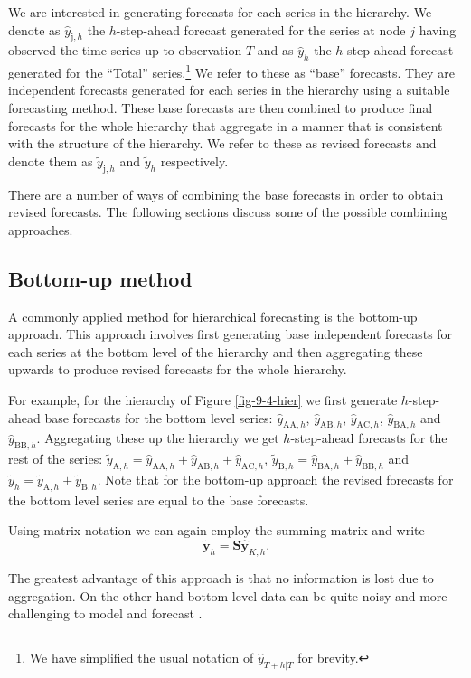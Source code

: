\documentclass[nojss]{jss}
\def\yhat#1#2{\hat{y}_{\text{#1},#2}}
\def\ytilde#1#2{\tilde{y}_{\text{#1},#2}}
\begin{document}
We are interested in generating forecasts for each series in the hierarchy. We denote as $\yhat{j}{h}$ the $h$-step-ahead forecast generated for the series at node $j$ having observed the time series up to observation $T$ and as $\hat{y}_{h}$ the $h$-step-ahead forecast generated for the ``Total'' series.\footnote{We have simplified the usual notation of $\hat{y}_{T+h|T}$ for brevity.} We refer to these as ``base'' forecasts. They are independent forecasts generated for each series in the hierarchy using a suitable forecasting method. These base forecasts are then combined to produce final forecasts for the whole hierarchy that aggregate in a manner that is consistent with the structure of the hierarchy. We refer to these as revised forecasts and denote them as $\ytilde{j}{h}$ and $\tilde{y}_{h}$ respectively.

There are a number of ways of combining the base forecasts in order to obtain revised forecasts. The following sections discuss some of the possible combining approaches.

\subsection*{Bottom-up method}

A commonly applied method for hierarchical forecasting is the bottom-up approach. This approach involves first generating base independent forecasts for each series at the bottom level of the hierarchy and then aggregating these upwards to produce revised forecasts for the whole hierarchy.

For example, for the hierarchy of Figure \ref{fig-9-4-hier} we first generate $h$-step-ahead base forecasts for the bottom level series: $\yhat{AA}{h}$, $\yhat{AB}{h}$, $\yhat{AC}{h}$, $\yhat{BA}{h}$ and $\yhat{BB}{h}$. Aggregating these up the hierarchy we get $h$-step-ahead forecasts for the rest of the series: $\ytilde{A}{h}= \yhat{AA}{h}+\yhat{AB}{h}+\yhat{AC}{h}$, $\ytilde{B}{h}= \yhat{BA}{h}+\yhat{BB}{h}$ and $\tilde{y}_{h}=\ytilde{A}{h}+\ytilde{B}{h}$. Note that for the bottom-up approach the revised forecasts for the bottom level series are equal to the base forecasts.

Using matrix notation we can again employ the summing matrix and write
\[
  \tilde{\bm{y}}_{h}=\bm{S}\hat{\bm{y}}_{K,h}.
\]
  
The greatest advantage of this approach is that no information is lost due to aggregation. On the other hand bottom level data can be quite noisy and more challenging to model and forecast \citep{SW79, STM88}.
\end{document}
